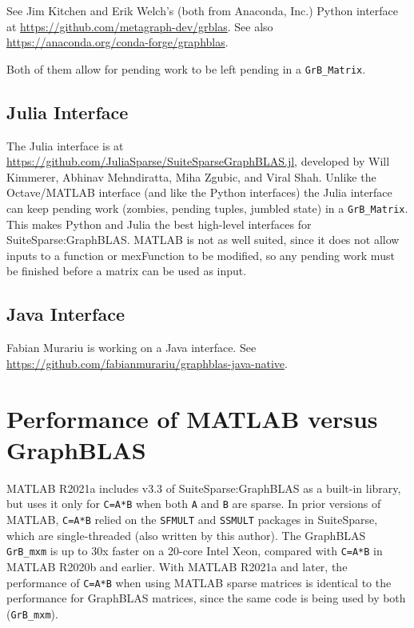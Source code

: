 \documentclass[12pt]{article}
\begin{document}
See Jim Kitchen and Erik Welch's (both from Anaconda, Inc.) Python interface at
\url{https://github.com/metagraph-dev/grblas}.
See also \\
\url{https://anaconda.org/conda-forge/graphblas}.

Both of them allow for pending work to be left pending in a \verb'GrB_Matrix'.

\subsection{Julia Interface}
\label{julia}

The Julia interface is at
\url{https://github.com/JuliaSparse/SuiteSparseGraphBLAS.jl}, developed by Will
Kimmerer, Abhinav Mehndiratta, Miha Zgubic, and Viral Shah.  
Unlike the Octave/MATLAB interface (and like the Python interfaces) the Julia 
interface can keep pending work (zombies, pending tuples, jumbled state) in
a \verb'GrB_Matrix'. This makes Python and Julia the best high-level interfaces
for SuiteSparse:GraphBLAS.  MATLAB is not as well suited, since it does not
allow inputs to a function or mexFunction to be modified, so any pending
work must be finished before a matrix can be used as input.

\subsection{Java Interface}
\label{java}

Fabian Murariu is working on a Java interface.
See \newline
\url{https://github.com/fabianmurariu/graphblas-java-native}.

\section{Performance of MATLAB versus GraphBLAS}
\label{matlab_performance}

MATLAB R2021a includes v3.3 of SuiteSparse:GraphBLAS as a built-in library, but
uses it only for \verb'C=A*B' when both \verb'A' and \verb'B' are sparse.  In
prior versions of MATLAB, \verb'C=A*B' relied on the \verb'SFMULT' and
\verb'SSMULT' packages in SuiteSparse, which are single-threaded (also written
by this author).  The GraphBLAS \verb'GrB_mxm' is up to 30x faster on a 20-core
Intel Xeon, compared with \verb'C=A*B' in MATLAB R2020b and earlier.  With
MATLAB R2021a and later, the performance of \verb'C=A*B' when using MATLAB
sparse matrices is identical to the performance for GraphBLAS matrices, since
the same code is being used by both (\verb'GrB_mxm').
\end{document}
